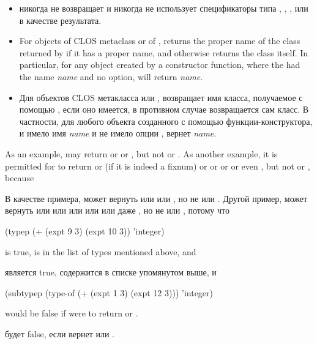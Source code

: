 \begin{defun}[Function]
\begin{new}
\begin{itemize}
\item
{} никогда не возвращает  и никогда не использует
спецификаторы типа , , ,  или  в
качестве результата.

\item
For objects of CLOS metaclass  or of ,
 returns the proper name of the class returned by 
if it has a proper name, and otherwise returns the class itself.
In particular,
for any object created by a  constructor function,
where the  had the name \emph{name} and no  option,
 will return \emph{name}.

\item
Для объектов CLOS метакласса  или ,
 возвращает имя класса, получаемое с помощью , если оно
имеется, в противном случае возвращается сам класс.
В частности, для любого объекта созданного с помощью 
функции-конструктора, и  имело имя \emph{name} и не имело опции
,  вернет \emph{name}.

\end{itemize}

As an example, 
may return  or  or ,
but not  or .
As another example, it is permitted for
 to return
 or  (if it is indeed a fixnum) or
 or  or 
or even , but not  or , because

В качестве примера,  может вернуть
 или  или , но не
 или .
Другой пример,  может вернуть  или 
или  или  или  или даже , но не  или , потому что
\begin{lisp}
(typep (+ (expt 9 3) (expt 10 3)) 'integer)
\end{lisp}
is true,  is in the list of types mentioned above, and

является true,  содержится в списке упомянутом выше, и 
\begin{lisp}
(subtypep (type-of (+ (expt 1 3) (expt 12 3))) 'integer)
\end{lisp}
would be false if  were to return  or .

будет false, если  вернет  или .
\end{new}
\end{defun}


